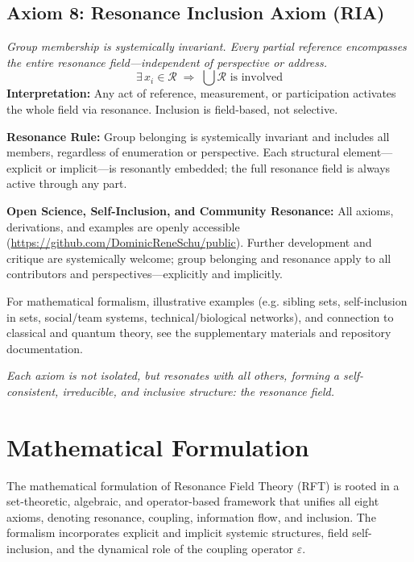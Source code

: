 \documentclass[12pt]{article}
\begin{document}
	\subsection{Axiom 8: Resonance Inclusion Axiom (RIA)}
	\textit{Group membership is systemically invariant. Every partial reference encompasses the entire resonance field—independent of perspective or address.}
	\[
	\exists\, x_i \in \mathcal{R} \;\Rightarrow\; \bigcup \mathcal{R} \text{ is involved}
	\]
	\textbf{Interpretation:} Any act of reference, measurement, or participation activates the whole field via resonance. Inclusion is field-based, not selective.
	
	\medskip
	
	\textbf{Resonance Rule:}  
	Group belonging is systemically invariant and includes all members, regardless of enumeration or perspective. Each structural element—explicit or implicit—is resonantly embedded; the full resonance field is always active through any part.
	
	\medskip
	
	\textbf{Open Science, Self-Inclusion, and Community Resonance:}  
	All axioms, derivations, and examples are openly accessible (\url{https://github.com/DominicReneSchu/public}). Further development and critique are systemically welcome; group belonging and resonance apply to all contributors and perspectives—explicitly and implicitly.
	
	\medskip
	
	For mathematical formalism, illustrative examples (e.g. sibling sets, self-inclusion in sets, social/team systems, technical/biological networks), and connection to classical and quantum theory, see the supplementary materials and repository documentation.
	
	\medskip
	
	\textit{Each axiom is not isolated, but resonates with all others, forming a self-consistent, irreducible, and inclusive structure: the resonance field.}

	
	\section{Mathematical Formulation}
	
	The mathematical formulation of Resonance Field Theory (RFT) is rooted in a set-theoretic, algebraic, and operator-based framework that unifies all eight axioms, denoting resonance, coupling, information flow, and inclusion. The formalism incorporates explicit and implicit systemic structures, field self-inclusion, and the dynamical role of the coupling operator $\varepsilon$.
	
\end{document}
